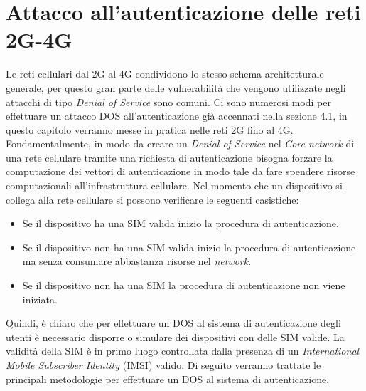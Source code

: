 \section{Attacco all'autenticazione delle reti 2G-4G}
Le reti cellulari dal 2G al 4G condividono lo stesso schema architetturale generale, per questo gran parte delle vulnerabilità che vengono
utilizzate negli attacchi di tipo \textit{Denial of Service} sono comuni.
Ci sono numerosi modi per effettuare un attacco DOS all'autenticazione già accennati nella sezione 4.1, in questo capitolo verranno messe in pratica 
nelle reti 2G fino al 4G.\\
Fondamentalmente, in modo da creare un \textit{Denial of Service} nel \textit{Core network} di una rete cellulare tramite una richiesta di autenticazione bisogna forzare
la computazione dei vettori di autenticazione in modo tale da fare spendere risorse computazionali all'infrastruttura cellulare.
Nel momento che un dispositivo si collega alla rete cellulare si possono verificare le seguenti casistiche:
\begin{itemize}
    \item Se il dispositivo ha una SIM valida inizio la procedura di autenticazione.
    \item Se il dispositivo non ha una SIM valida inizio la procedura di autenticazione ma senza consumare abbastanza risorse nel \textit{network}.
    \item Se il dispositivo non ha una SIM la procedura di autenticazione non viene iniziata.
\end{itemize}
Quindi, è chiaro che per effettuare un DOS al sistema di autenticazione degli utenti è necessario disporre o simulare dei dispositivi con delle SIM valide. La validità della SIM è 
in primo luogo controllata dalla presenza di un \textit{International Mobile Subscriber Identity } (IMSI) valido.
Di seguito verranno trattate le principali metodologie per effettuare un DOS al sistema di autenticazione.

